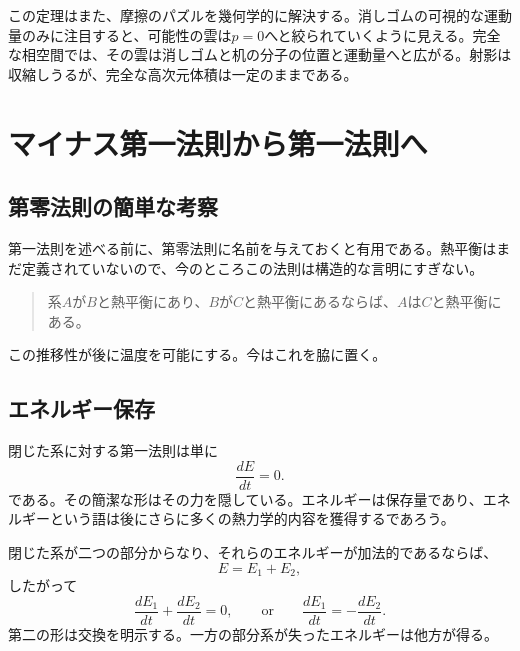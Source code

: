 この定理はまた、摩擦のパズルを幾何学的に解決する。消しゴムの可視的な運動量のみに注目すると、可能性の雲は\(p=0\)へと絞られていくように見える。完全な相空間では、その雲は消しゴムと机の分子の位置と運動量へと広がる。射影は収縮しうるが、完全な高次元体積は一定のままである。

\begin{classroomqa}
\end{classroomqa}

\section{マイナス第一法則から第一法則へ}

\subsection{第零法則の簡単な考察}

第一法則を述べる前に、第零法則に名前を与えておくと有用である。熱平衡はまだ定義されていないので、今のところこの法則は構造的な言明にすぎない。
\begin{quote}
系\(A\)が\(B\)と熱平衡にあり、\(B\)が\(C\)と熱平衡にあるならば、\(A\)は\(C\)と熱平衡にある。
\end{quote}
この推移性が後に温度を可能にする。今はこれを脇に置く。

\subsection{エネルギー保存}

閉じた系に対する第一法則は単に
\begin{equation}
 \frac{dE}{dt}=0.
 \label{eq:sm1-first-law}
\end{equation}
である。その簡潔な形はその力を隠している。エネルギーは保存量であり、エネルギーという語は後にさらに多くの熱力学的内容を獲得するであろう。

閉じた系が二つの部分からなり、それらのエネルギーが加法的であるならば、
\begin{equation}
 E=E_1+E_2,
\end{equation}
したがって
\begin{equation}
 \frac{dE_1}{dt}+\frac{dE_2}{dt}=0,
 \qquad\text{or}\qquad
 \frac{dE_1}{dt}=-\frac{dE_2}{dt}.
 \label{eq:sm1-energy-exchange}
\end{equation}
第二の形は交換を明示する。一方の部分系が失ったエネルギーは他方が得る。

